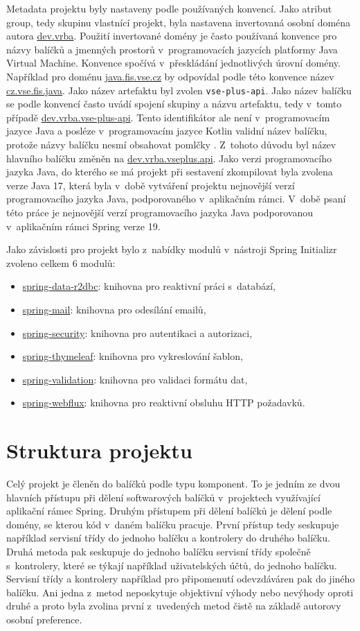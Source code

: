 Metadata projektu byly nastaveny podle používaných konvencí. Jako atribut group, tedy skupinu vlastnící projekt, byla nastavena invertovaná osobní doména autora \url{dev.vrba}. Použití invertované domény je často používaná konvence pro názvy balíčků a jmenných prostorů v~programovacích jazycích platformy Java Virtual Machine. Konvence spočívá v~přeskládání jednotlivých úrovní domény. Například pro doménu \url{java.fis.vse.cz} by odpovídal podle této konvence název \url{cz.vse.fis.java}. Jako název artefaktu byl zvolen \verb|vse-plus-api|. Jako název balíčku se podle konvencí často uvádí spojení skupiny a názvu artefaktu, tedy v~tomto případě \url{dev.vrba.vse-plus-api}. Tento identifikátor ale není v~programovacím jazyce Java a posléze v~programovacím jazyce Kotlin validní název balíčku, protože názvy balíčku nesmí obsahovat pomlčky \cite{gosling_java_2022}. Z~tohoto důvodu byl název hlavního balíčku změněn na \url{dev.vrba.vseplus.api}. Jako verzi programovacího jazyka Java, do kterého se má projekt při sestavení zkompilovat byla zvolena verze Java 17, která byla v~době vytváření projektu nejnovější verzí programovacího jazyka Java, podporovaného v~aplikačním rámci. V~době psaní této práce je nejnovější verzí programovacího jazyka Java podporovanou v~aplikačním rámci Spring verze 19.

Jako závislosti pro projekt bylo z~nabídky modulů v~nástroji Spring Initializr zvoleno celkem 6 modulů:

\begin{itemize}
    \item \url{spring-data-r2dbc}: knihovna pro reaktivní práci s~databází,
    \item \url{spring-mail}: knihovna pro odesílání emailů,
    \item \url{spring-security}: knihovna pro autentikaci a autorizaci,
    \item \url{spring-thymeleaf}: knihovna pro vykreslování šablon,
    \item \url{spring-validation}: knihovna pro validaci formátu dat,
    \item \url{spring-webflux}: knihovna pro reaktivní obsluhu HTTP požadavků.
\end{itemize}

\section{Struktura projektu}

Celý projekt je členěn do balíčků podle typu komponent. To je jedním ze dvou hlavních přístupu při dělení softwarových balíčků v~projektech využívající aplikační rámec Spring. Druhým přístupem při dělení balíčků je dělení podle domény, se kterou kód v~daném balíčku pracuje. První přístup tedy seskupuje například servisní třídy do jednoho balíčku a kontrolery do druhého balíčku. Druhá metoda pak seskupuje do jednoho balíčku servisní třídy společně s~kontrolery, které se týkají například uživatelských účtů, do jednoho balíčku. Servisní třídy a kontrolery například pro připomenutí odevzdáváren pak do jiného balíčku. Ani jedna z~metod neposkytuje objektivní výhody nebo nevýhody oproti druhé a proto byla zvolina první z~uvedených metod čistě na základě autorovy osobní preference. 


